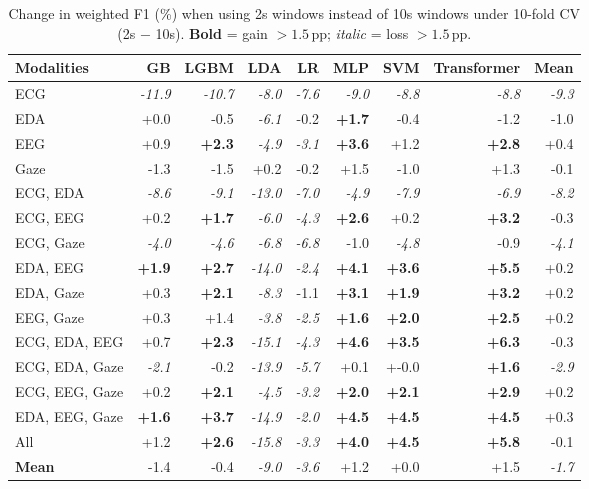 \begin{table}[!htbp]
  \centering
  \scriptsize
  \setlength{\tabcolsep}{3pt}
  \caption{Change in weighted F1 (\%) when using 2s windows instead of 10s windows under 10-fold CV (2s $-$ 10s). \textbf{Bold} = gain $>1.5$\,pp; \textit{italic} = loss $>1.5$\,pp.}
  \label{tab:delta_10fold}
  \begin{tabular}{lrrrrrrrr}
    \toprule
    \textbf{Modalities} & GB & LGBM & LDA & LR & MLP & SVM & Transformer & \textbf{Mean} \\
    \midrule
    ECG & \textit{-11.9} & \textit{-10.7} & \textit{-8.0} & \textit{-7.6} & \textit{-9.0} & \textit{-8.8} & \textit{-8.8} & \textit{-9.3} \\
    EDA & +0.0 & -0.5 & \textit{-6.1} & -0.2 & \textbf{+1.7} & -0.4 & -1.2 & -1.0 \\
    EEG & +0.9 & \textbf{+2.3} & \textit{-4.9} & \textit{-3.1} & \textbf{+3.6} & +1.2 & \textbf{+2.8} & +0.4 \\
    Gaze & -1.3 & -1.5 & +0.2 & -0.2 & +1.5 & -1.0 & +1.3 & -0.1 \\
    \midrule
    ECG, EDA & \textit{-8.6} & \textit{-9.1} & \textit{-13.0} & \textit{-7.0} & \textit{-4.9} & \textit{-7.9} & \textit{-6.9} & \textit{-8.2} \\
    ECG, EEG & +0.2 & \textbf{+1.7} & \textit{-6.0} & \textit{-4.3} & \textbf{+2.6} & +0.2 & \textbf{+3.2} & -0.3 \\
    ECG, Gaze & \textit{-4.0} & \textit{-4.6} & \textit{-6.8} & \textit{-6.8} & -1.0 & \textit{-4.8} & -0.9 & \textit{-4.1} \\
    EDA, EEG & \textbf{+1.9} & \textbf{+2.7} & \textit{-14.0} & \textit{-2.4} & \textbf{+4.1} & \textbf{+3.6} & \textbf{+5.5} & +0.2 \\
    EDA, Gaze & +0.3 & \textbf{+2.1} & \textit{-8.3} & -1.1 & \textbf{+3.1} & \textbf{+1.9} & \textbf{+3.2} & +0.2 \\
    EEG, Gaze & +0.3 & +1.4 & \textit{-3.8} & \textit{-2.5} & \textbf{+1.6} & \textbf{+2.0} & \textbf{+2.5} & +0.2 \\
    \midrule
    ECG, EDA, EEG & +0.7 & \textbf{+2.3} & \textit{-15.1} & \textit{-4.3} & \textbf{+4.6} & \textbf{+3.5} & \textbf{+6.3} & -0.3 \\
    ECG, EDA, Gaze & \textit{-2.1} & -0.2 & \textit{-13.9} & \textit{-5.7} & +0.1 & +-0.0 & \textbf{+1.6} & \textit{-2.9} \\
    ECG, EEG, Gaze & +0.2 & \textbf{+2.1} & \textit{-4.5} & \textit{-3.2} & \textbf{+2.0} & \textbf{+2.1} & \textbf{+2.9} & +0.2 \\
    EDA, EEG, Gaze & \textbf{+1.6} & \textbf{+3.7} & \textit{-14.9} & \textit{-2.0} & \textbf{+4.5} & \textbf{+4.5} & \textbf{+4.5} & +0.3 \\
    \midrule
    All & +1.2 & \textbf{+2.6} & \textit{-15.8} & \textit{-3.3} & \textbf{+4.0} & \textbf{+4.5} & \textbf{+5.8} & -0.1 \\
    \midrule
    \textbf{Mean} & -1.4 & -0.4 & \textit{-9.0} & \textit{-3.6} & +1.2 & +0.0 & +1.5 & \textit{-1.7} \\
    \bottomrule
  \end{tabular}
\end{table}
